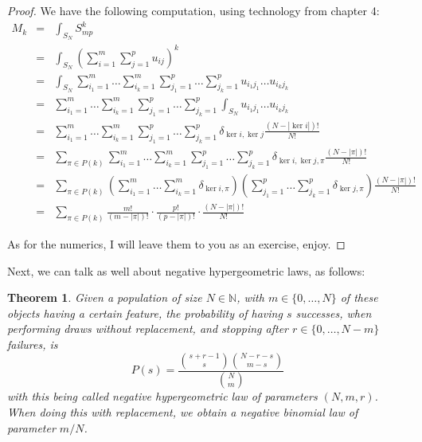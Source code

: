 \documentclass[12pt]{amsbook}
\newtheorem{theorem}{Theorem}[chapter]
\begin{document}
\begin{proof}
We have the following computation, using technology from chapter 4:
\begin{eqnarray*}
M_k
&=&\int_{S_N}S_{mp}^k\\
&=&\int_{S_N}\left(\sum_{i=1}^m\sum_{j=1}^pu_{ij}\right)^k\\
&=&\int_{S_N}\sum_{i_1=1}^m\ldots\sum_{i_k=1}^m\sum_{j_1=1}^p\ldots\sum_{j_k=1}^pu_{i_1j_1}\ldots u_{i_kj_k}\\
&=&\sum_{i_1=1}^m\ldots\sum_{i_k=1}^m\sum_{j_1=1}^p\ldots\sum_{j_k=1}^p\int_{S_N}u_{i_1j_1}\ldots u_{i_kj_k}\\
&=&\sum_{i_1=1}^m\ldots\sum_{i_k=1}^m\sum_{j_1=1}^p\ldots\sum_{j_k=1}^p\delta_{\ker i,\ker j}\frac{(N-|\ker i|)!}{N!}\\
&=&\sum_{\pi\in P(k)}\sum_{i_1=1}^m\ldots\sum_{i_k=1}^m\sum_{j_1=1}^p\ldots\sum_{j_k=1}^p\delta_{\ker i,\ker j,\pi}\frac{(N-|\pi|)!}{N!}\\
&=&\sum_{\pi\in P(k)}\left(\sum_{i_1=1}^m\ldots\sum_{i_k=1}^m\delta_{\ker i,\pi}\right)
\left(\sum_{j_1=1}^p\ldots\sum_{j_k=1}^p\delta_{\ker j,\pi}\right)\frac{(N-|\pi|)!}{N!}\\
&=&\sum_{\pi\in P(k)}\frac{m!}{(m-|\pi|)!}\cdot\frac{p!}{(p-|\pi|)!}\cdot\frac{(N-|\pi|)!}{N!}
\end{eqnarray*}

As for the numerics, I will leave them to you as an exercise, enjoy.
\end{proof}

Next, we can talk as well about negative hypergeometric laws, as follows:


\begin{theorem}
Given a population of size $N\in\mathbb N$, with $m\in\{0,\ldots,N\}$ of these objects having a certain feature, the probability of having $s$ successes, when performing draws without replacement, and stopping after $r\in\{0,\ldots,N-m\}$ failures, is
$$P(s)=\frac{\binom{s+r-1}{s}\binom{N-r-s}{m-s}}{\binom{N}{m}}$$
with this being called negative hypergeometric law of parameters $(N,m,r)$. When doing this with replacement, we obtain a negative binomial law of parameter $m/N$.
\end{theorem}
\end{document}
